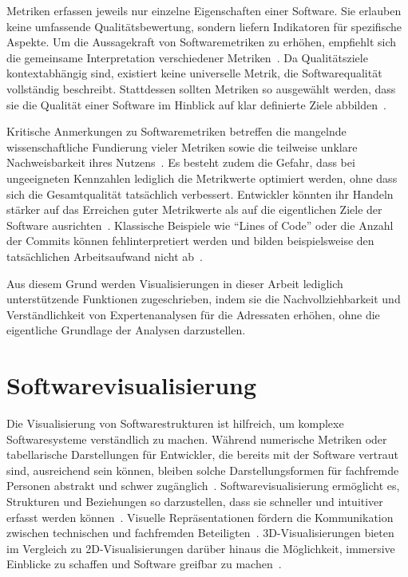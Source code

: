Metriken erfassen jeweils nur einzelne Eigenschaften einer Software. Sie erlauben keine umfassende Qualitätsbewertung, sondern liefern Indikatoren für spezifische Aspekte. Um die Aussagekraft von Softwaremetriken zu erhöhen, empfiehlt sich die gemeinsame Interpretation verschiedener Metriken~\cite{schmitz_2019}. Da Qualitätsziele kontextabhängig sind, existiert keine universelle Metrik, die Softwarequalität vollständig beschreibt. Stattdessen sollten Metriken so ausgewählt werden, dass sie die Qualität einer Software im Hinblick auf klar definierte Ziele abbilden~\cite{hall1994implementing}.

Kritische Anmerkungen zu Softwaremetriken betreffen die mangelnde wissenschaftliche Fundierung vieler Metriken sowie die teilweise unklare Nachweisbarkeit ihres Nutzens~\cite{voas_kuhn_2017}. Es besteht zudem die Gefahr, dass bei ungeeigneten Kennzahlen lediglich die Metrikwerte optimiert werden, ohne dass sich die Gesamtqualität tatsächlich verbessert. Entwickler könnten ihr Handeln stärker auf das Erreichen guter Metrikwerte als auf die eigentlichen Ziele der Software ausrichten~\cite{worst_gitclear_2025}. Klassische Beispiele wie \enquote{Lines of Code} oder die Anzahl der Commits können fehlinterpretiert werden und bilden beispielsweise den tatsächlichen Arbeitsaufwand nicht ab~\cite{worst_gitclear_2025}.

Aus diesem Grund werden Visualisierungen in dieser Arbeit lediglich unterstützende Funktionen zugeschrieben, indem sie die Nachvollziehbarkeit und Verständlichkeit von Expertenanalysen für die Adressaten erhöhen, ohne die eigentliche Grundlage der Analysen darzustellen.

\section{Softwarevisualisierung} \label{sec:SoftwareVisualisierung}

Die Visualisierung von Softwarestrukturen ist hilfreich, um komplexe Softwaresysteme verständlich zu machen. Während numerische Metriken oder tabellarische Darstellungen für Entwickler, die bereits mit der Software vertraut sind, ausreichend sein können, bleiben solche Darstellungsformen für fachfremde Personen abstrakt und schwer zugänglich~\cite{overview3D}. Softwarevisualisierung ermöglicht es, Strukturen und Beziehungen so darzustellen, dass sie schneller und intuitiver erfasst werden können~\cite{diehl2007software}. Visuelle Repräsentationen fördern die Kommunikation zwischen technischen und fachfremden Beteiligten~\cite{baltes2017sketches}. 3D-Visualisierungen bieten im Vergleich zu 2D-Visualisierungen darüber hinaus die Möglichkeit, immersive Einblicke zu schaffen und Software greifbar zu machen~\cite{codeCity1}.

